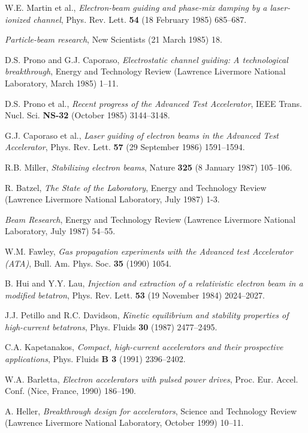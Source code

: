 \documentclass [12pt,a4paper,     ]{report} %
\begin{document}
\begin{enumerate}
 W.E. Martin et al., \emph{Electron-beam guiding and phase-mix damping by a laser-ionized channel}, Phys. Rev. Lett. {\bf 54} (18 February 1985) 685--687.

 \emph{Particle-beam research}, New Scientists (21 March 1985) 18.

 D.S. Prono and G.J. Caporaso, \emph{Electrostatic channel guiding: A technological breakthrough}, Energy and Technology Review (Lawrence Livermore National Laboratory, March 1985) 1--11.

 D.S. Prono et al., \emph{Recent progress of the Advanced Test Accelerator}, IEEE Trans. Nucl. Sci. {\bf NS-32} (October 1985) 3144--3148.

 G.J. Caporaso et al., \emph{Laser guiding of electron beams in the Advanced Test Accelerator}, Phys. Rev. Lett. {\bf 57} (29 September 1986) 1591--1594.

 R.B. Miller, \emph{Stabilizing electron beams}, Nature {\bf 325} (8 January 1987) 105--106.

 R. Batzel, \emph{The State of the Laboratory}, Energy and Technology Review (Lawrence Livermore National Laboratory, July 1987) 1-3.

 \emph{Beam Research}, Energy and Technology Review (Lawrence Livermore National Laboratory, July 1987) 54--55.

 W.M. Fawley, \emph{Gas propagation experiments with the Advanced test Accelerator (ATA)}, Bull. Am. Phys. Soc. {\bf 35} (1990) 1054.

 B. Hui and Y.Y. Lau, \emph{Injection and extraction of a relativistic electron beam in a modified betatron}, Phys. Rev. Lett. {\bf 53} (19 November 1984) 2024--2027.

 J.J. Petillo and R.C. Davidson, \emph{Kinetic equilibrium and stability properties of high-current betatrons}, Phys. Fluids {\bf 30} (1987) 2477--2495.

 C.A. Kapetanakos, \emph{Compact, high-current accelerators and their prospective applications}, Phys. Fluids {\bf B 3} (1991) 2396--2402. %

 W.A. Barletta, \emph{Electron accelerators with pulsed power drives}, Proc. Eur. Accel. Conf. (Nice, France, 1990) 186--190.

 A. Heller, \emph{Breakthrough design for accelerators}, Science and Technology Review (Lawrence Livermore National Laboratory, October 1999) 10--11. 


\end{enumerate}
\end{document}
